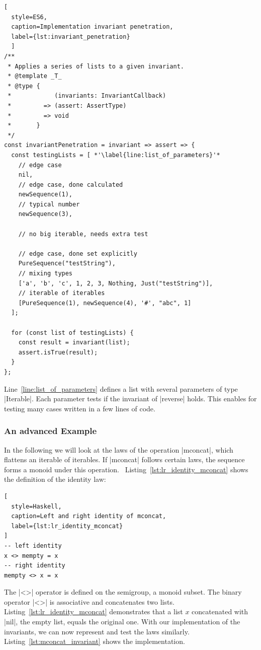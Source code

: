 \begin{lstlisting}[
  style=ES6, 
  caption=Implementation invariant penetration,
  label={lst:invariant_penetration}
  ]
/**
 * Applies a series of lists to a given invariant.
 * @template _T_
 * @type {
 *            (invariants: InvariantCallback)
 *         => (assert: AssertType)
 *         => void
 *       }
 */
const invariantPenetration = invariant => assert => {
  const testingLists = [ *'\label{line:list_of_parameters}'*
    // edge case
    nil,                                                   
    // edge case, done calculated
    newSequence(1),                                        
    // typical number
    newSequence(3),                                        

    // no big iterable, needs extra test

    // edge case, done set explicitly
    PureSequence("testString"),                            
    // mixing types
    ['a', 'b', 'c', 1, 2, 3, Nothing, Just("testString")], 
    // iterable of iterables
    [PureSequence(1), newSequence(4), '#', "abc", 1]       
  ];

  for (const list of testingLists) {
    const result = invariant(list);
    assert.isTrue(result);
  }
};
\end{lstlisting}

Line~\ref{line:list_of_parameters} defines a list with several parameters of
type |Iterable|. Each parameter tests if the invariant of |reverse| holds. 
This enables for testing many cases written in a few lines of code.

\subsubsection{An advanced Example}
\label{subsub:An advanced Example}
In the following we will look at the laws of the operation |mconcat|, which
flattens an iterable of iterables. If |mconcat| follows certain laws, the
sequence forms a monoid under this operation.~\cite{haskell_monoid}
Listing~\ref{lst:lr_identity_mconcat} shows the definition of the identity law:

\begin{lstlisting}[
  style=Haskell,
  caption=Left and right identity of mconcat,
  label={lst:lr_identity_mconcat}
]
-- left identity
x <> mempty = x
-- right identity
mempty <> x = x
\end{lstlisting}

The |<>| operator is defined on the semigroup, a monoid subset. The binary 
operator |<>| is associative and concatenates two lists.
Listing~\ref{lst:lr_identity_mconcat} demonstrates that a list $x$ concatenated
with |nil|, the empty list, equals the original one. With our implementation of
the invariants, we can now represent and test the laws similarly.
Listing~\ref{lst:mconcat_invariant} shows the implementation.


